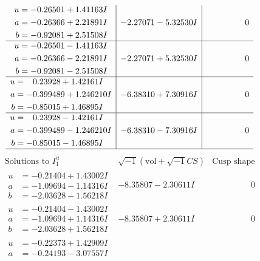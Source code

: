 \documentclass[1p]{elsarticle_modified}
\theoremstyle{definition}
\newcommand{\I}{\sqrt{-1}}
\begin{document}
$$\begin{array}{c|c|c}
\begin{aligned}
u &= -0.26501 + 1.41163 I \\
a &= -0.26366 + 2.21891 I \\
b &= -0.92081 + 2.51508 I\end{aligned}
 & -2.27071 - 5.32530 I & \phantom{-0.000000 } 0 \\ \hline\begin{aligned}
u &= -0.26501 - 1.41163 I \\
a &= -0.26366 - 2.21891 I \\
b &= -0.92081 - 2.51508 I\end{aligned}
 & -2.27071 + 5.32530 I & \phantom{-0.000000 } 0 \\ \hline\begin{aligned}
u &= \phantom{-}0.23928 + 1.42161 I \\
a &= -0.399489 + 1.246210 I \\
b &= -0.85015 + 1.46895 I\end{aligned}
 & -6.38310 + 7.30916 I & \phantom{-0.000000 } 0 \\ \hline\begin{aligned}
u &= \phantom{-}0.23928 - 1.42161 I \\
a &= -0.399489 - 1.246210 I \\
b &= -0.85015 - 1.46895 I\end{aligned}
 & -6.38310 - 7.30916 I & \phantom{-0.000000 } 0\\
 \hline 
 \end{array}$$\newpage$$\begin{array}{c|c|c}  
\text{Solutions to }I^u_{1}& \I (\text{vol} + \sqrt{-1}CS) & \text{Cusp shape}\\
 \hline 
\begin{aligned}
u &= -0.21404 + 1.43002 I \\
a &= -1.09694 - 1.14316 I \\
b &= -2.03628 - 1.56218 I\end{aligned}
 & -8.35807 - 2.30611 I & \phantom{-0.000000 } 0 \\ \hline\begin{aligned}
u &= -0.21404 - 1.43002 I \\
a &= -1.09694 + 1.14316 I \\
b &= -2.03628 + 1.56218 I\end{aligned}
 & -8.35807 + 2.30611 I & \phantom{-0.000000 } 0 \\ \hline\begin{aligned}
u &= -0.22373 + 1.42909 I \\
a &= -0.24193 - 3.07557 I \\

\end{aligned}
\end{array}$$
\end{document}
